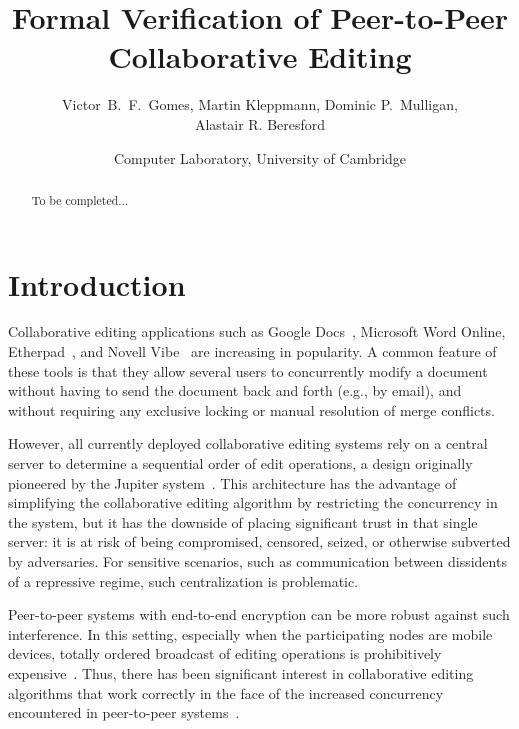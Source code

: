 \documentclass[11pt]{article}
\title{Formal Verification of Peer-to-Peer Collaborative Editing}
\author{Victor~B.~F.~Gomes, Martin Kleppmann, Dominic P.~Mulligan,\\Alastair R. Beresford}
\date{Computer Laboratory, University of Cambridge}
\begin{document}
\maketitle

\begin{abstract}
To be completed...
\end{abstract}


\newpage
\section{Introduction}
\label{sect.introduction}

Collaborative editing applications such as Google Docs~\cite{DayRichter:2010tt}, Microsoft Word
Online, Etherpad~\cite{Etherpad:2011um}, and Novell Vibe~\cite{Spiewak:2010vw} are increasing in
popularity. A common feature of these tools is that they allow several users to concurrently modify
a document without having to send the document back and forth (e.g., by email), and without
requiring any exclusive locking or manual resolution of merge conflicts.

However, all currently deployed collaborative editing systems rely on a central server to determine
a sequential order of edit operations, a design originally pioneered by the Jupiter
system~\cite{Nichols:1995fd}. This architecture has the advantage of simplifying the collaborative
editing algorithm by restricting the concurrency in the system, but it has the downside of placing
significant trust in that single server: it is at risk of being compromised, censored, seized, or
otherwise subverted by adversaries. For sensitive scenarios, such as communication between
dissidents of a repressive regime, such centralization is problematic.

Peer-to-peer systems with end-to-end encryption can be more robust against such interference. In
this setting, especially when the participating nodes are mobile devices, totally ordered broadcast
of editing operations is prohibitively expensive~\cite{Attiya:2015dm}. Thus, there has been
significant interest in collaborative editing algorithms that work correctly in the face of the
increased concurrency encountered in peer-to-peer systems~\cite{Randolph:2015gj}.
\end{document}
